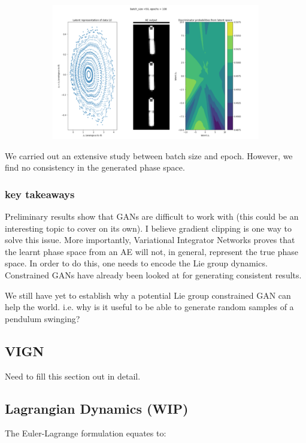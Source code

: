 \documentclass{article}
\begin{document}
\begin{figure}[h!]
\begin{subfigure}{0.7\textwidth}
\includegraphics[width=\textwidth]{figures/gan_phase_3stack.png}
\end{subfigure}
\end{figure}

We carried out an extensive study between batch size and epoch. However, we find no consistency in the generated phase space.

\subsubsection*{key takeaways}

Preliminary results show that GANs are difficult to work with (this could be an interesting topic to cover on its own). I believe gradient clipping is one way to solve this issue. 
More importantly, Variational Integrator Networks proves that the learnt phase space from an AE will not, in general, represent the true phase space. In order to do this, one needs to encode the Lie group dynamics.
Constrained GANs have already been looked at for generating consistent results.

We still have yet to establish why a potential Lie group constrained GAN can help the world. i.e. why is it useful to be able to generate random samples of a pendulum swinging?


\subsection{VIGN}

Need to fill this section out in detail.


\subsection{Lagrangian Dynamics (WIP)}
The Euler-Lagrange formulation equates to:
\end{document}
